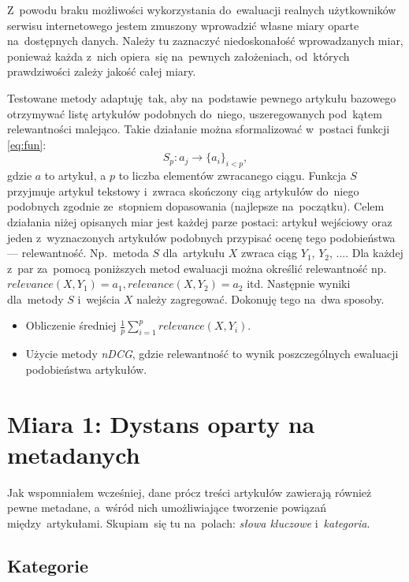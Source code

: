 \documentclass[pl]{minipw} %
\begin{document}
Z~powodu braku możliwości wykorzystania do~ewaluacji realnych użytkowników serwisu internetowego jestem zmuszony wprowadzić własne miary oparte na~dostępnych danych. Należy tu zaznaczyć niedoskonałość wprowadzanych miar, ponieważ każda z~nich opiera~się na~pewnych założeniach, od~których prawdziwości zależy jakość całej miary.

Testowane metody adaptuję tak, aby na~podstawie pewnego artykułu bazowego otrzymywać listę artykułów podobnych do~niego, uszeregowanych pod~kątem relewantności malejąco. Takie działanie można sformalizować w~postaci funkcji \ref{eq:fun}:
\begin{equation}
\label{eq:fun}
S_p: a_j \to \{a_{i}\}_{i < p},
\end{equation}
gdzie $a$ to artykuł, a $p$ to liczba elementów zwracanego ciągu. Funkcja $S$ przyjmuje artykuł tekstowy i~zwraca skończony ciąg artykułów do~niego podobnych zgodnie ze~stopniem dopasowania (najlepsze na~początku). Celem działania niżej opisanych miar jest każdej parze postaci: artykuł wejściowy oraz jeden z~wyznaczonych artykułów podobnych przypisać ocenę tego podobieństwa --- relewantność. Np.~metoda $S$ dla~artykułu $X$ zwraca ciąg {$Y_1$, $Y_2$, ...}. Dla każdej z~par za~pomocą poniższych metod ewaluacji można określić relewantność np.~$relevance(X, Y_1) = a_1, relevance(X, Y_2) = a_2$ itd. Następnie wyniki dla~metody $S$ i~wejścia $X$ należy zagregować. Dokonuję tego na~dwa sposoby.
\begin{itemize}
	\item Obliczenie średniej $\frac{1}{p}\sum_{i=1}^{p}relevance(X,Y_i)$.
	\item Użycie metody \textit{nDCG}, gdzie relewantność to wynik poszczególnych ewaluacji podobieństwa artykułów.
\end{itemize}  

\section{Miara 1: Dystans oparty na metadanych}

Jak wspomniałem wcześniej, dane prócz treści artykułów zawierają również pewne metadane, a~wśród nich umożliwiające tworzenie powiązań między~artykułami. Skupiam~się tu na~polach: \textit{słowa kluczowe} i~\textit{kategoria}.

\subsection{Kategorie} 
\end{document}
